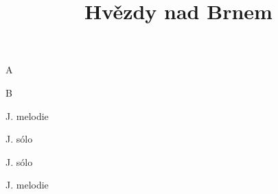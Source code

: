 \documentclass[timestamp]{jazzgrid}
\title{Hvězdy nad Brnem}
\begin{document}
\maketitle
\begin{musicsection}{A}
\barline
	{\barfour{}
		{}
		{}
		{}
		{}
	}
	{\barfour{}
		{}
		{}
		{}
		{}
	}
	{\barfour{}
		{}
		{}
		{}
		{}
	}
	{\barfour{}
		{}
		{}
		{}
		{}
	}
\barline
	{\barfour{}
		{}
		{}
		{}
		{}
	}
	{\barfour{}
		{}
		{}
		{}
		{}
	}
	{
		{}
		{}
		{}
		{}
	}
	{\barfour{}
		{}
		{}
		{}
		{}
	}
	{
		{}
		{}
		{}
		{}
	}
	{\barfour{}
		{}
		{}
		{}
		{}
	}
\end{musicsection}

\begin{musicsection}{B}
\barline
	{\barfour{}
		{}
		{}
		{}
		{}
	}
	{\barfour{}
		{}
		{}
		{}
		{}
	}
	{\barfour{}
		{}
		{}
		{}
		{}
	}
	{\barfour{}
		{}
		{}
		{}
		{}
	}
\barline
	{\barfour{}
		{}
		{}
		{}
		{}
	}
	{\barfour{}
		{}
		{}
		{}
		{}
	}
	{\barfour{}
		{}
		{}
		{}
		{}
	}
	{\barfour{}
		{}
		{}
		{}
		{}
	}
\end{musicsection}
\begin{multicols*}{2}
	\footnotesize
	\begin{description}[noitemsep,align=right,labelwidth=\widthof{\bfseries{AABA}}]
	\item [AABA] J. melodie
	\item [AABA] J. sólo
	\item [AABA] J. sólo
	\item [AABA] J. melodie
\end{description}
\end{multicols*}
\end{document}
